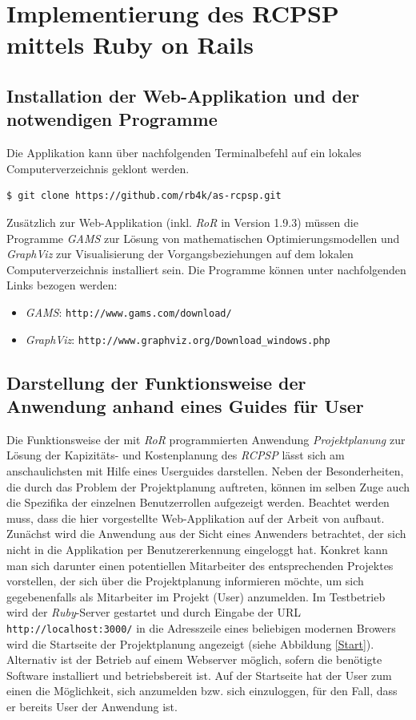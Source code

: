 \documentclass[a4paper,12pt,parskip,bibtotoc,liststotoc]{article}
\begin{document}
\section{Implementierung des RCPSP mittels Ruby on Rails} \label{Haupt}
\subsection{Installation der Web-Applikation und der notwendigen Programme}
Die Applikation kann über nachfolgenden Terminalbefehl auf ein lokales Computerverzeichnis geklont werden.
\begin{lstlisting}[style=Befehl]
$ git clone https://github.com/rb4k/as-rcpsp.git
\end{lstlisting}
Zusätzlich zur Web-Applikation (inkl. \textit{RoR} in Version 1.9.3) müssen die Programme \textit{GAMS} zur Lösung von mathematischen Optimierungsmodellen und \textit{GraphViz} zur Visualisierung der Vorgangsbeziehungen auf dem lokalen Computerverzeichnis installiert sein. Die Programme können unter nachfolgenden Links bezogen werden:
\begin{itemize}
\item \textit{GAMS}: \texttt{http://www.gams.com/download/}
\item \textit{GraphViz}: \texttt{http://www.graphviz.org/Download\_windows.php}
\end{itemize}

\subsection{Darstellung der Funktionsweise der Anwendung anhand eines Guides für User}\label{User}
Die Funktionsweise der mit \textit{RoR} programmierten Anwendung \textit {\glqq Projektplanung\grqq} zur Lösung der Kapizitäts- und Kostenplanung des \textit{RCPSP} lässt sich am anschaulichsten mit Hilfe eines Userguides darstellen. 
Neben der Besonderheiten, die durch das Problem der Projektplanung auftreten, können im selben Zuge auch die Spezifika der einzelnen Benutzerrollen aufgezeigt werden. Beachtet werden muss, dass die hier vorgestellte Web-Applikation auf der Arbeit von \cite{hartl2012ruby} aufbaut.\\

Zunächst wird die Anwendung aus der Sicht eines Anwenders betrachtet, der sich nicht in die Applikation per Benutzererkennung eingeloggt hat. Konkret kann man sich darunter einen potentiellen Mitarbeiter des entsprechenden Projektes vorstellen, der sich über die Projektplanung informieren möchte, um sich gegebenenfalls als Mitarbeiter im Projekt (User) anzumelden. Im Testbetrieb wird der \textit{Ruby}-Server gestartet und durch Eingabe der URL \texttt{http://localhost:3000/} in die Adresszeile eines beliebigen modernen Browers wird die Startseite der Projektplanung angezeigt (siehe Abbildung \ref{Start}). Alternativ ist der Betrieb auf einem Webserver möglich, sofern die benötigte Software installiert und betriebsbereit ist. Auf der Startseite hat der User zum einen die Möglichkeit, sich anzumelden bzw. sich einzuloggen, für den Fall, dass er bereits User der Anwendung ist. \\
\end{document}

